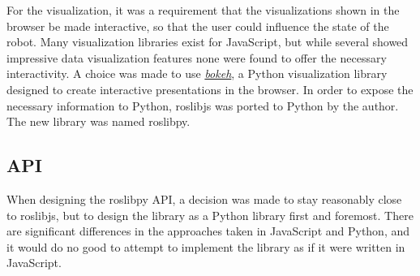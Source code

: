 \documentclass[\rootfolder/main.tex]{subfiles}
\begin{document}
For the visualization, it was a requirement that the visualizations shown in the browser be made interactive, so that the user could influence the state of the robot.
Many visualization libraries exist for JavaScript, but while several showed impressive data visualization features none were found to offer the necessary interactivity.
A choice was made to use \href{https://bokeh.pydata.org}{\emph{bokeh}}, a Python visualization library designed to create interactive presentations in the browser.
In order to expose the necessary information to Python, roslibjs was ported to Python by the author.
The new library was named roslibpy.

\subsection{API}

When designing the roslibpy API, a decision was made to stay reasonably close to roslibjs, but to design the library as a Python library first and foremost.
There are significant differences in the approaches taken in JavaScript and Python, and it would do no good to attempt to implement the library as if it were written in JavaScript.
\end{document}
